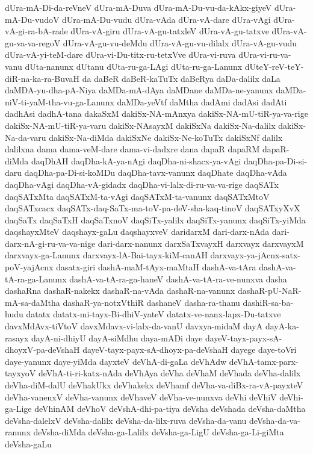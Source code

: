 {dUra-mA-Di-da-reVneV
dUra-mA-Duva
dUra-mA-Du-vu-da-kAkx-giyeV
dUra-mA-Du-vudoV
dUra-mA-Du-vudu
dUra-vAda
dUra-vA-dare
dUra-vAgi
dUra-vA-gi-ra-bA-rade
dUra-vA-giru
dUra-vA-gu-tatxleV
dUra-vA-gu-tatxve
dUra-vA-gu-va-va-regoV
dUra-vA-gu-vu-deMdu
dUra-vA-gu-vu-dilalx
dUra-vA-gu-vudu
dUra-vA-yi-teM-dare
dUra-vi-Du-titx-ru-tetxVve
dUra-vi-ruva
dUra-vi-ru-va-vanu
dUta-nanunx
dUtanu
dUta-ru-ga-LAgi
dUta-ru-ga-Lanunx
dUteY-reV-teY-diR-na-ka-ra-BuvaH
da
daBeR
daBeR-kaTuTx
daBeRya
daDa-dalilx
daLa
daMDA-yu-dha-pA-Niya
daMDa-mA-dAya
daMDane
daMDa-ne-yanunx
daMDa-niV-ti-yaM-tha-vu-ga-Lanunx
daMDa-yeVtf
daMtha
dadAmi
dadAsi
dadAti
dadhAsi
dadhA-tana
dakaSxM
dakiSx-NA-mAnxya
dakiSx-NA-mU-tiR-ya-va-rige
dakiSx-NA-mU-tiR-ya-varu
dakiSx-NAsayxM
dakiSxNa
dakiSx-Na-dalilx
dakiSx-Na-da-varu
dakiSx-Na-diMda
dakiSxNe
dakiSx-Ne-koTuTx
dakiSxNf
dalilx
dalilxna
dama
dama-veM-dare
dama-vi-dadxre
dana
dapaR
dapaRM
dapaR-diMda
daqDhAH
daqDha-kA-ya-nAgi
daqDha-ni-shacx-ya-vAgi
daqDha-pa-Di-si-daru
daqDha-pa-Di-si-koMDu
daqDha-tavx-vanunx
daqDhate
daqDha-vAda
daqDha-vAgi
daqDha-vA-gidadx
daqDha-vi-lalx-di-ru-va-va-rige
daqSATx
daqSATxMta
daqSATxM-ta-vAgi
daqSATxM-ta-vanunx
daqSATxMtoV
daqSATxcacx
daqSATx-daq-SaTx-ma-toV-pa-deV-sha-kaq-tinoV
daqSATxyXvX
daqSaTx
daqSaTxH
daqSaTxnoV
daqSiTx-yalilx
daqSiTx-yanunx
daqSiTx-yiMda
daqshayxMteV
daqshayx-gaLu
daqshayxveV
daridarxM
dari-darx-nAda
dari-darx-nA-gi-ru-va-va-nige
dari-darx-nanunx
darxSaTxvayxH
darxvayx
darxvayxM
darxvayx-ga-Lanunx
darxvayx-lA-Bai-tayx-kiM-canAH
darxvayx-ya-jAcnx-satx-poV-yajAcnx
dasatx-giri
dashA-maM-tAyx-maMtaH
dashA-va-tAra
dashA-va-tA-ra-ga-Lanunx
dashA-va-tA-ra-ga-haneV
dashA-va-tA-ra-ve-nunxva
dasha
dashaRna
dashaR-nakekx
dashaR-na-vAda
dashaR-na-vanunx
dashaR-pU-NaR-mA-sa-daMtha
dashaR-ya-notxVthiR
dashaneV
dasha-ra-thanu
dashiR-sa-ba-hudu
datatx
datatx-mi-tayx-Bi-dhiV-yateV
datatx-ve-nanx-lapx-Du-tatxve
davxMdAvx-tiVtoV
davxMdavx-vi-lalx-da-vanU
davxya-midaM
dayA
dayA-ka-rasayx
dayA-ni-dhiyU
dayA-siMdhu
daya-mADi
daye
dayeV-tayx-payx-sA-dhoyxV-pa-deVshaH
dayeV-tayx-payx-sA-dhoyx-pa-deVshaH
dayege
daye-toVri
daye-yanunx
daye-yiMda
dayxteV
deVhA-di-gaLa
deVhAdw
deVhA-tamx-parx-tayxyoV
deVhA-ti-ri-katx-nAda
deVhAya
deVha
deVhaM
deVhada
deVha-dalilx
deVha-diM-dalU
deVhakUkx
deVhakekx
deVhamf
deVha-va-diBx-ra-vA-payxteV
deVha-vanenxV
deVha-vanunx
deVhaveV
deVha-ve-nunxva
deVhi
deVhiV
deVhi-ga-Lige
deVhinAM
deVhoV
deVshA-dhi-pa-tiya
deVsha
deVshada
deVsha-daMtha
deVsha-dalelxV
deVsha-dalilx
deVsha-da-lilx-ruva
deVsha-da-vanu
deVsha-da-va-ranunx
deVsha-diMda
deVsha-ga-Lalilx
deVsha-ga-LigU
deVsha-ga-Li-giMta
deVsha-gaLu
}

